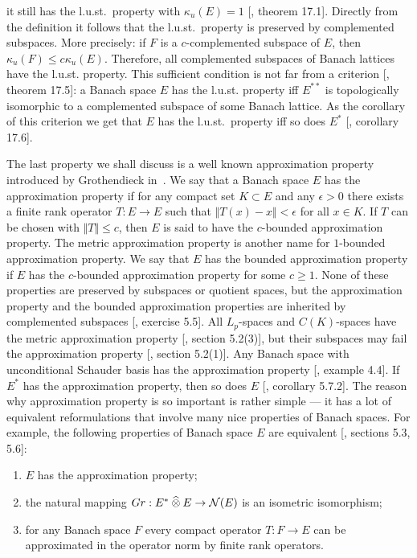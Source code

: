 it still has the l.u.st.\ property with $\kappa_u(E)=1$
[\cite{DiestAbsSumOps}, theorem 17.1]. Directly from the definition it follows
that the l.u.st.\ property is preserved by complemented subspaces. More
precisely: if $F$ is a $c$-complemented subspace of $E$, 
then $\kappa_u(F)\leq c\kappa_u(E)$. 
Therefore, all complemented subspaces of Banach lattices have the
l.u.st. property. This sufficient condition is not far from a criterion
[\cite{DiestAbsSumOps}, theorem 17.5]: a Banach space $E$ has the l.u.st.
property iff $E^{**}$ is topologically isomorphic to a complemented subspace of
some Banach lattice. As the corollary of this criterion we get that $E$ has the
l.u.st.\ property iff so does $E^*$ [\cite{DiestAbsSumOps}, corollary 17.6].

The last property we shall discuss is a well known approximation property
introduced by Grothendieck in~\cite{GrothProdTenTopNucl}. We say that a Banach
space $E$ has the approximation property if for any compact set $K\subset E$ and
any $\epsilon>0$ there exists a finite rank operator $T:E\to E$ such 
that $\Vert T(x)-x\Vert<\epsilon$ for all $x\in K$. If $T$ can be 
chosen with $\Vert T\Vert\leq c$, then $E$ is said to have the $c$-bounded
approximation property. The metric approximation property is another name for
$1$-bounded approximation property. We say that $E$ has the bounded
approximation property if $E$ has the $c$-bounded approximation property for
some $c\geq 1$. None of these properties are preserved by subspaces or quotient
spaces, but the approximation property and the bounded approximation properties
are inherited by complemented subspaces [\cite{DefFloTensNorOpId}, exercise
5.5]. All $L_p$-spaces and $C(K)$-spaces have the metric approximation property
[\cite{DefFloTensNorOpId}, section 5.2(3)], but their subspaces may fail the
approximation property [\cite{DefFloTensNorOpId}, section 5.2(1)]. Any Banach
space with unconditional Schauder basis has the approximation property
[\cite{RyanIntroTensNormsBanSp}, example 4.4]. If $E^*$ has the approximation
property, then so does $E$ [\cite{DefFloTensNorOpId}, corollary 5.7.2]. The
reason why approximation property is so important is rather simple --- it has a
lot of equivalent reformulations that involve many nice properties of Banach
spaces. For example, the following properties of Banach space $E$ are equivalent
[\cite{DefFloTensNorOpId}, sections 5.3, 5.6]:
\begin{enumerate}[label = (\roman*)]
  \item $E$ has the approximation property;

  \item the natural mapping $Gr:E^*\mathbin{\widehat{\otimes}} E\to\mathcal{N}(E)$ is an isometric
  isomorphism;

  \item for any Banach space $F$ every compact operator $T:F\to E$ can be
  approximated in the operator norm by finite rank operators.
\end{enumerate}

